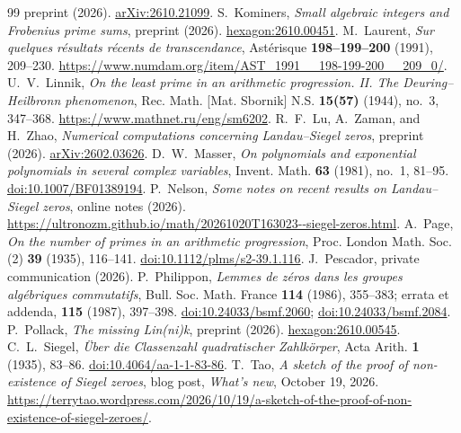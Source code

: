 \documentclass[11pt,a4paper]{amsart}
\theoremstyle{remark}
\numberwithin{equation}{section}
\begin{document}
\begin{thebibliography}{99}
preprint (2026).
\href{https://arxiv.org/abs/2610.21099}{arXiv:2610.21099}.
S.~Kominers, \emph{Small algebraic integers and Frobenius prime sums},
preprint (2026).
\href{https://hexagonmath.org/2610.00451}{hexagon:2610.00451}.
M.~Laurent, \emph{Sur quelques r\'esultats r\'ecents de transcendance},
Ast\'erisque \textbf{198--199--200} (1991), 209--230.
\url{https://www.numdam.org/item/AST_1991__198-199-200__209_0/}.
U.~V.~Linnik, \emph{On the least prime in an arithmetic progression.
II. The Deuring--Heilbronn phenomenon},
Rec. Math. [Mat. Sbornik] N.S. \textbf{15(57)} (1944), no.~3, 347--368.
\url{https://www.mathnet.ru/eng/sm6202}.
R.~F.~Lu, A.~Zaman, and H.~Zhao,
\emph{Numerical computations concerning Landau--Siegel zeros},
preprint (2026).
\href{https://arxiv.org/abs/2602.03626}{arXiv:2602.03626}.
D.~W.~Masser, \emph{On polynomials and exponential polynomials in several
complex variables}, Invent. Math. \textbf{63} (1981), no.~1, 81--95.
\href{https://doi.org/10.1007/BF01389194}{doi:10.1007/BF01389194}.
P.~Nelson, \emph{Some notes on recent results on Landau--Siegel zeros},
online notes (2026).
\url{https://ultronozm.github.io/math/20261020T163023--siegel-zeros.html}.
A.~Page, \emph{On the number of primes in an arithmetic progression},
Proc. London Math. Soc. (2) \textbf{39} (1935), 116--141.
\href{https://doi.org/10.1112/plms/s2-39.1.116}{doi:10.1112/plms/s2-39.1.116}.
J.~Pescador, private communication (2026).
P.~Philippon, \emph{Lemmes de z\'eros dans les groupes alg\'ebriques commutatifs},
Bull. Soc. Math. France \textbf{114} (1986), 355--383;
errata et addenda, \textbf{115} (1987), 397--398.
\href{https://doi.org/10.24033/bsmf.2060}{doi:10.24033/bsmf.2060};
\href{https://doi.org/10.24033/bsmf.2084}{doi:10.24033/bsmf.2084}.
P.~Pollack, \emph{The missing Lin(ni)k}, preprint (2026).
\href{https://hexagonmath.org/2610.00545}{hexagon:2610.00545}.
C.~L.~Siegel, \emph{\"Uber die Classenzahl quadratischer Zahlk\"orper},
Acta Arith. \textbf{1} (1935), 83--86.
\href{https://doi.org/10.4064/aa-1-1-83-86}{doi:10.4064/aa-1-1-83-86}.
T.~Tao, \emph{A sketch of the proof of non-existence of Siegel zeroes},
blog post, \emph{What's new}, October 19, 2026.
\url{https://terrytao.wordpress.com/2026/10/19/a-sketch-of-the-proof-of-non-existence-of-siegel-zeroes/}.
\end{thebibliography}
\end{document}
